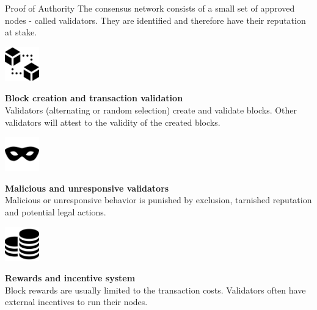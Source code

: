 \documentclass[handout]{beamer}
\begin{document}
	\begin{frame}{Proof of Authority}
		\small
		The consensus network consists of a \color{focus}small set of approved nodes \color{black} - called validators. They are identified and therefore have their reputation at stake.
		
		\pause
		\vspace{1.5 em}
		\begin{minipage}{0.2\textwidth}
			\begin{center}
				\includegraphics[height=4em]{../assets/images/blocks}
			\end{center}
		\end{minipage}
		\begin{minipage}{0.7\textwidth}
			\textbf{Block creation and transaction validation} \\
			Validators (alternating or random selection) create and validate blocks. Other validators will attest to the validity of the created blocks.
		\end{minipage}
		
		\pause
		\vspace{1.5 em}
		\begin{minipage}{0.2\textwidth}
			\begin{center}
				\includegraphics[height=4em]{../assets/images/mask}
			\end{center}
		\end{minipage}
		\begin{minipage}{0.7\textwidth}
			\textbf{Malicious and unresponsive validators} \\
			Malicious or unresponsive behavior is punished by exclusion, tarnished reputation and potential legal actions.
		\end{minipage}
		
		\pause
		\vspace{1.5 em}
		\begin{minipage}{0.2\textwidth}
			\begin{center}
				\includegraphics[height=4em]{../assets/images/coin-stack}
			\end{center}
		\end{minipage}
		\begin{minipage}{0.7\textwidth}
			\textbf{Rewards and incentive system} \\
			Block rewards are usually limited to the transaction costs. Validators often have external incentives to run their nodes.
		\end{minipage}
	\end{frame}
	
\end{document}
